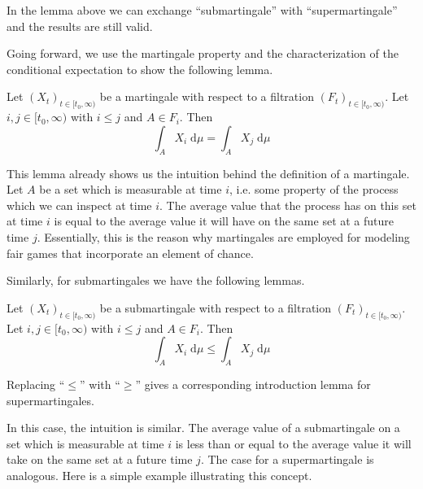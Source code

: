 \begin{remark}
In the lemma above we can exchange ``submartingale'' with ``supermartingale'' and the results are still valid.
\end{remark}

Going forward, we use the martingale property and the characterization of the conditional expectation to show the following lemma.

\begin{lemma}
	Let $(X_t)_{t \in [t_0,\infty)}$ be a martingale with respect to a filtration $(F_t)_{t \in [t_0,\infty)}$. Let $i,j \in [t_0,\infty)$ with $i \le j$ and $A \in F_i$. Then
	\[
		\int_A X_i \; \textrm{d}\mu = \int_A X_j \; \textrm{d}\mu
	\]
\end{lemma}

This lemma already shows us the intuition behind the definition of a martingale. Let $A$ be a set which is measurable at time $i$, i.e. some property of the process which we can inspect at time $i$. The average value that the process has on this set at time $i$ is equal to the average value it will have on the same set at a future time $j$. Essentially, this is the reason why martingales are employed for modeling fair games that incorporate an element of chance. 

Similarly, for submartingales we have the following lemmas.

\begin{lemma}
	Let $(X_t)_{t \in [t_0,\infty)}$ be a submartingale with respect to a filtration $(F_t)_{t \in [t_0,\infty)}$. Let $i,j \in [t_0,\infty)$ with $i \le j$ and $A \in F_i$. Then
	\[
		\int_A X_i \; \textrm{d}\mu \le \int_A X_j \; \textrm{d}\mu
	\]
\end{lemma}

Replacing ``$\le$'' with ``$\ge$'' gives a corresponding introduction lemma for supermartingales.

In this case, the intuition is similar. The average value of a submartingale on a set which is measurable at time $i$ is less than or equal to the average value it will take on the same set at a future time $j$. The case for a supermartingale is analogous. Here is a simple example illustrating this concept.

